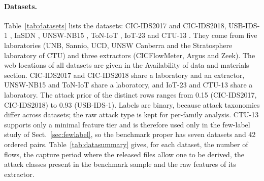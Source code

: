 \documentclass[11pt]{article}
\begin{document}
\paragraph{Datasets.}
Table~\ref{tab:datasets} lists the datasets: CIC-IDS2017 \citep{sharafaldin2018cicids} and CIC-IDS2018, USB-IDS-1 \citep{catillo2021usbids1}, InSDN \citep{elsayed2020insdn}, UNSW-NB15 \citep{moustafa2015unsw}, ToN-IoT \citep{alsaedi2020toniot}, IoT-23 \citep{garcia2020iot23} and CTU-13 \citep{garcia2014ctu13}.
They come from five laboratories (UNB, Sannio, UCD, UNSW Canberra and the Stratosphere laboratory of CTU) and three extractors (CICFlowMeter, Argus and Zeek).
The web locations of all datasets are given in the Availability of data and materials section.
CIC-IDS2017 and CIC-IDS2018 share a laboratory and an extractor, UNSW-NB15 and ToN-IoT share a laboratory, and IoT-23 and CTU-13 share a laboratory.
The attack prior of the distinct rows ranges from 0.15 (CIC-IDS2017, CIC-IDS2018) to 0.93 (USB-IDS-1).
Labels are binary, because attack taxonomies differ across datasets; the raw attack type is kept for per-family analysis.
CTU-13 supports only a minimal feature tier and is therefore used only in the few-label study of Sect.~\ref{sec:fewlabel}, so the benchmark proper has seven datasets and 42 ordered pairs.
Table~\ref{tab:datasummary} gives, for each dataset, the number of flows, the capture period where the released files allow one to be derived, the attack classes present in the benchmark sample and the raw features of its extractor.

\begin{table}[t]
\centering\small
\caption{Datasets. The attack prior is that of the distinct rows after harmonisation. CTU-13 supports only the minimal feature tier and is excluded from the seven-dataset benchmark.}\label{tab:datasets}

\end{table}

\begin{table}[t]
\centering\scriptsize
\caption{Summary of the datasets. Flows: valid labelled flows after cleaning, before the distinct-row sampling (the benchmark sample has at most 100\,000 rows). Capture period: derived from the timestamps of the released file or from the file names; ``n/a'' where the released files have none or mix timestamp formats, so no reliable range exists. Attack classes: those present in the benchmark sample, so a very rare class can be absent; names are as released (for example, ``Infilteration'' is the spelling of CIC-IDS2018). Raw features: number of columns of the released file and four examples; the benchmark uses only the 13 harmonised features of Sect.~\ref{sec:benchdata}.}\label{tab:datasummary}
\resizebox{\textwidth}{!}{}
\end{table}
\end{document}
